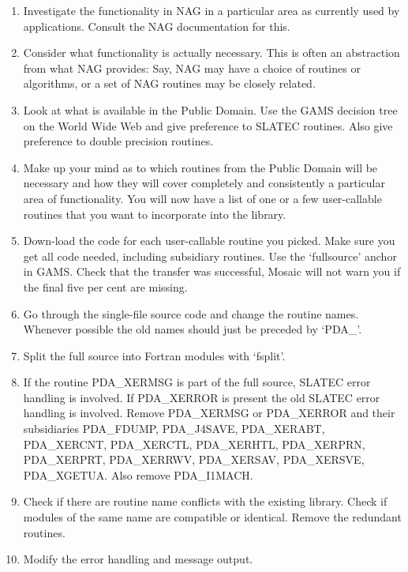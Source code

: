 \documentclass[11pt,twoside]{article}
\newcommand{\htmladdnormallink}[2]{#1}
\newcommand{\htmlref}[2]{#1}
\begin{document}
\sloppy
\begin{enumerate}
\item
   Investigate the functionality in NAG in a particular area as
   currently used by applications. Consult the NAG documentation for
   this.
\item
   Consider what functionality is actually necessary. This is often an
   abstraction from what NAG provides: Say, NAG may have a choice of
   routines or algorithms, or a set of NAG routines may be closely
   related.
\item
   Look at what is available in the Public Domain. Use the
\htmladdnormallink{GAMS decision tree}
{http://gams.nist.gov/cgi-bin/gams-serve}
   on the World Wide Web and give preference to SLATEC routines. Also give
   preference to double precision routines.
\item
   Make up your mind as to which routines from the Public Domain will be
   necessary and how they will cover completely and consistently a
   particular area of functionality. You will now have a list of one or
   a few user-callable routines that you want to incorporate into the
   library.
\item
   Down-load the code for each user-callable routine you picked. Make
   sure you get all code needed, including subsidiary routines. Use the
   `fullsource' anchor in GAMS. Check that the transfer was
   successful, Mosaic will not warn you if the final five per cent are
   missing.
\item
   Go through the single-file source code and change the routine names.
   Whenever possible the old names should just be preceded by `PDA\_'.
\item
   Split the full source into Fortran modules with `fsplit'.
\item
   If the routine
\htmlref{PDA\_XERMSG}{PDA\_XERMSG}
   is part of the full source, SLATEC error
   handling is involved. If PDA\_XERROR is present the old SLATEC error
   handling is involved. Remove PDA\_XERMSG or PDA\_XERROR and their
   subsidiaries PDA\_FDUMP, PDA\_J4SAVE, PDA\_XERABT, PDA\_XERCNT,
   PDA\_XERCTL, PDA\_XERHTL, PDA\_XERPRN, PDA\_XERPRT, PDA\_XERRWV,
   PDA\_XERSAV, PDA\_XERSVE, PDA\_XGETUA. Also remove PDA\_I1MACH.
\item
   Check if there are routine name conflicts with the existing library.
   Check if modules of the same name are compatible or identical. Remove
   the redundant routines.
\item
   Modify the error handling and message output.
   \begin{itemize}

\end{itemize}
\end{enumerate}
\end{document}
